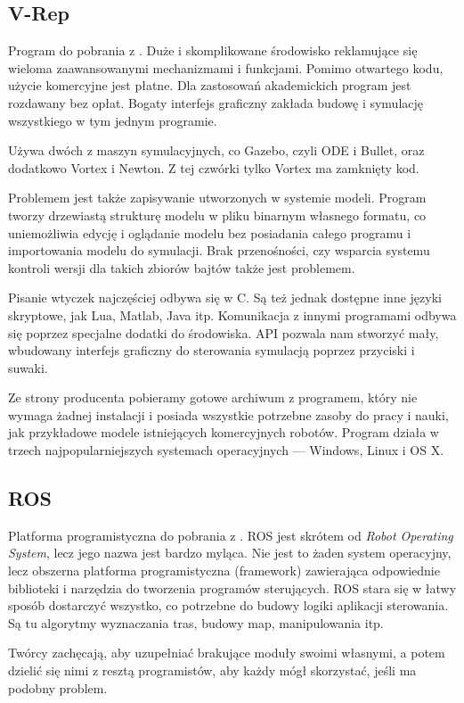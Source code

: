 	\subsection{V-Rep}
	Program do pobrania z \cite{vrep_website}. Duże i skomplikowane środowisko reklamujące się wieloma zaawansowanymi mechanizmami i funkcjami.
	Pomimo otwartego kodu, użycie komercyjne jest płatne. Dla zastosowań akademickich program jest rozdawany bez opłat.
	Bogaty interfejs graficzny zakłada budowę i symulację wszystkiego w tym jednym programie.

	Używa dwóch z maszyn symulacyjnych, co Gazebo, czyli ODE i Bullet, oraz dodatkowo Vortex i Newton. Z tej czwórki tylko Vortex ma zamknięty kod.

	Problemem jest także zapisywanie utworzonych w systemie modeli.
	Program tworzy drzewiastą strukturę modelu w pliku binarnym własnego formatu, co uniemożliwia edycję i oglądanie modelu bez posiadania całego programu i importowania modelu do symulacji.
	Brak przenośności, czy wsparcia systemu kontroli wersji dla takich zbiorów bajtów także jest problemem.

	Pisanie wtyczek najczęściej odbywa się w C. Są też jednak dostępne inne języki skryptowe, jak Lua, Matlab, Java itp.
	Komunikacja z innymi programami odbywa się poprzez specjalne dodatki do środowiska.
	API pozwala nam stworzyć mały, wbudowany interfejs graficzny do sterowania symulacją poprzez przyciski i suwaki.

	Ze strony producenta pobieramy gotowe archiwum z programem, który nie wymaga żadnej instalacji i posiada wszystkie potrzebne zasoby do pracy i nauki, jak przykładowe modele istniejących komercyjnych robotów.
	Program działa w trzech najpopularniejszych systemach operacyjnych --- Windows, Linux i OS X.

	\subsection{ROS}
	Platforma programistyczna do pobrania z \cite{ros_website}.
	ROS jest skrótem od \emph{Robot Operating System}, lecz jego nazwa jest bardzo myląca.
	Nie jest to żaden system operacyjny, lecz obszerna platforma programistyczna (framework) zawierająca odpowiednie biblioteki i narzędzia do tworzenia programów sterujących.
	ROS stara się w łatwy sposób dostarczyć wszystko, co potrzebne do budowy logiki aplikacji sterowania.
	Są tu algorytmy wyznaczania tras, budowy map, manipulowania itp. 

	Twórcy zachęcają, aby uzupełniać brakujące moduły swoimi własnymi, a potem dzielić się nimi z resztą programistów, aby każdy mógł skorzystać, jeśli ma podobny problem.

